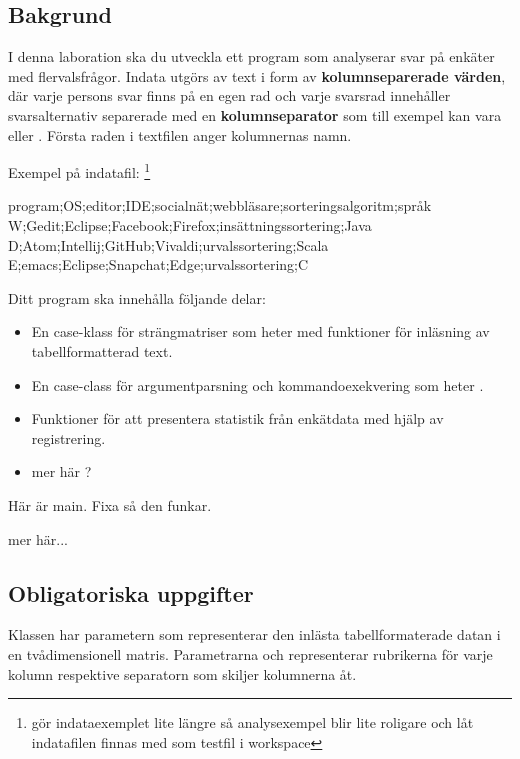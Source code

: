 \subsection{Bakgrund}

I denna laboration ska du utveckla ett program som analyserar svar på enkäter med flervalsfrågor. Indata utgörs av text i form av \textbf{kolumnseparerade värden}, där varje persons svar finns på en egen rad och varje svarsrad innehåller svarsalternativ separerade med en \textbf{kolumnseparator} som till exempel kan vara \code{;} eller \code{\t}. Första raden i textfilen anger kolumnernas namn.

Exempel på indatafil: \footnote{\TODO gör indataexemplet lite längre så analysexempel blir lite roligare och låt indatafilen finnas med som testfil i workspace}
\begin{CodeSmall}[language=, ]
program;OS;editor;IDE;socialnät;webbläsare;sorteringsalgoritm;språk
W;Gedit;Eclipse;Facebook;Firefox;insättningssortering;Java
D;Atom;Intellij;GitHub;Vivaldi;urvalssortering;Scala
E;emacs;Eclipse;Snapchat;Edge;urvalssortering;C
\end{CodeSmall}

Ditt program ska innehålla följande delar:
\begin{itemize}
\item En case-klass för strängmatriser som heter  med funktioner för inläsning av tabellformatterad text.
\item En case-class för argumentparsning och kommandoexekvering som heter . 
\item Funktioner för att presentera statistik från enkätdata med hjälp av registrering.
\item \TODO mer här ?
\end{itemize}

Här är main. Fixa så den funkar.



\TODO mer här...



\subsection{Obligatoriska uppgifter}

Klassen  har parametern  som representerar den inlästa tabellformaterade datan i en tvådimensionell matris. Parametrarna  och  representerar rubrikerna för varje kolumn respektive separatorn som skiljer kolumnerna åt.

